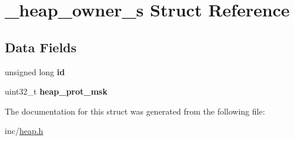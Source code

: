 \hypertarget{struct__heap__owner__s}{}\section{\+\_\+heap\+\_\+owner\+\_\+s Struct Reference}
\label{struct__heap__owner__s}
\subsection*{Data Fields}
\begin{DoxyCompactItemize}
\item 
unsigned long {\bfseries id}\hypertarget{struct__heap__owner__s_a094ca656e5419990afcce891a445543c}{}\label{struct__heap__owner__s_a094ca656e5419990afcce891a445543c}

\item 
uint32\+\_\+t {\bfseries heap\+\_\+prot\+\_\+msk}\hypertarget{struct__heap__owner__s_a9b9653385831e1f6266ebb3aeb0f1bec}{}\label{struct__heap__owner__s_a9b9653385831e1f6266ebb3aeb0f1bec}

\end{DoxyCompactItemize}


The documentation for this struct was generated from the following file\+:\begin{DoxyCompactItemize}
\item 
inc/\hyperlink{heap_8h}{heap.\+h}\end{DoxyCompactItemize}
